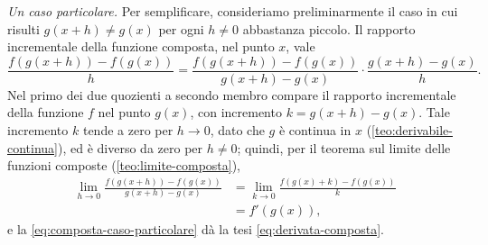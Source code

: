 \begin{dimostrazione}
\emph{Un caso particolare.} Per semplificare, consideriamo preliminarmente il caso in
cui risulti $g(x+h)\neq g(x)$ per ogni $h\neq0$ abbastanza piccolo. Il rapporto
incrementale della funzione composta, nel punto $x$, vale
\begin{equation}\label{eq:composta-caso-particolare}
  \frac{f(g(x+h))-f(g(x))}{h}=\frac{f(g(x+h))-f(g(x))}{g(x+h)-g(x)}\cdot\frac{g(x+h)-g(x)}{h}.
\end{equation}
Nel primo dei due quozienti a secondo membro compare il rapporto incrementale della
funzione $f$ nel punto $g(x)$, con incremento $k=g(x+h)-g(x)$. Tale incremento $k$ tende a
zero per $h\to0$, dato che $g$ è continua in $x$ (\cref{teo:derivabile-continua}), ed è
diverso da zero per $h\neq0$; quindi, per il teorema sul limite delle funzioni composte
(\cref{teo:limite-composta}),
\begin{equation}\label{eq:composta-limite-particolare}
\begin{split}
  \lim_{h\to0}\frac{f(g(x+h))-f(g(x))}{g(x+h)-g(x)}
  &=\lim_{k\to0}\frac{f(g(x)+k)-f(g(x))}{k}\\
  &=f'(g(x)),
\end{split}
\end{equation}
e la \eqref{eq:composta-caso-particolare} dà la tesi \eqref{eq:derivata-composta}.


\end{dimostrazione}
